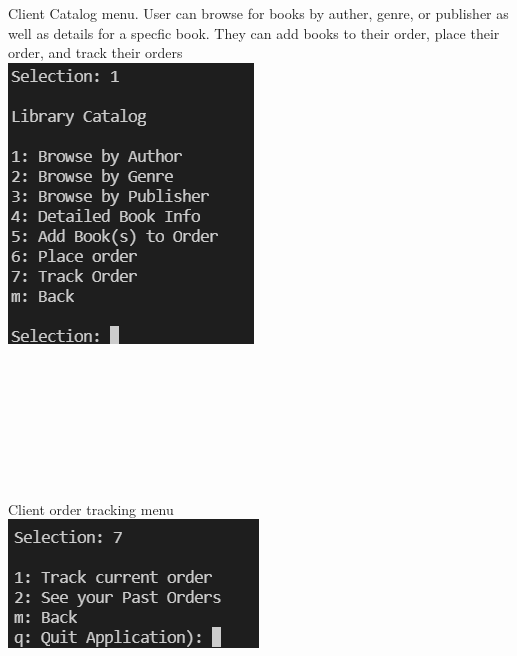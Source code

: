 \documentclass[Project Report]{article}
\begin{document}
Client Catalog menu. User can browse for books by auther, genre, or publisher as well as details for a specfic book. They can add books to their order, place their order, and track their orders\\
{\centering \includegraphics[width=\textwidth]{../Screenshots/Client_Catalog_menu.PNG}}\\\\\\\\\\\\\\\

Client order tracking menu\\
{\centering \includegraphics[width=\textwidth]{../Screenshots/Client_order_tracker_menu.PNG}}\\\\\\\\
\end{document}
